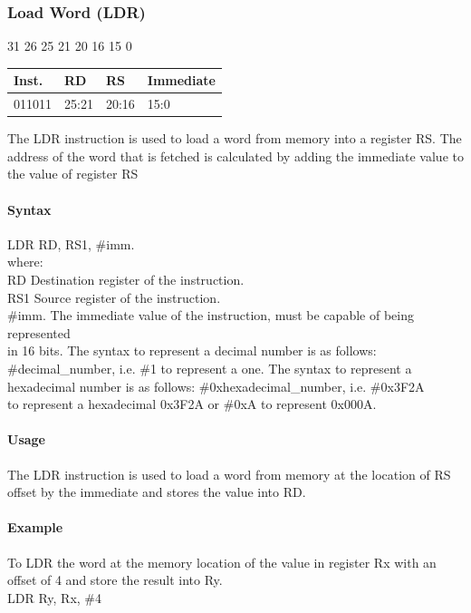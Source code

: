 \documentclass[12pt]{article}
\newcommand{\iTypeInstruction}[6]
{%
    \hspace{1.6cm}31 \hspace{1.15cm}26 \hspace{.05cm}25 \hspace{.8cm}21 \hspace{.05cm}20 \hspace{.8cm}16 \hspace{.05cm}15 \hspace{6.4cm}0
    \vspace{-.25cm}
    \begin{center}
        \begin{tabular}{ |p{1.8cm}|p{1.5cm}|p{1.5cm}|p{6.8cm}| }
            \hline
            \textbf{Inst.} & \textbf{RD} &  \textbf{RS} & \textbf{Immediate}\\
            \hline
            #1 & 25:21 & 20:16 &15:0\\
            \hline
        \end{tabular}
    \end{center}
    
    \noindent
    #2
    
    \paragraph{Syntax}
    \begin{flushleft}
    #3 RD, RS1, \#imm.\\
    \vspace{1em}        %
    where:\\
    \vspace{1em}
    RD  \hspace{3.6em} Destination register of the instruction.\\
    \vspace{1em}
    RS1  \hspace{3.35em} Source register of the instruction.\\
    \vspace{1em}
    \#imm.  \hspace{1.8em} The immediate value of the instruction, must be capable of being represented\\             \hspace{5.4em} in 16 bits. The syntax to represent a decimal number is as follows:\\
            \hspace{5.4em} \#decimal\_number, i.e. \#1 to represent a one. The syntax to represent a\\
            \hspace{5.4em} hexadecimal number is as follows: \#0xhexadecimal\_number, i.e. \#0x3F2A \\
            \hspace{5.4em} to represent a hexadecimal 0x3F2A or \#0xA to represent 0x000A.\\
    \end{flushleft}
    
    \paragraph{Usage}
    \begin{flushleft}
    #4\\
    \end{flushleft}
    \paragraph{Example}
    \begin{flushleft}
    #5\\
    \vspace{1em}
    #6
    \end{flushleft}}
\begin{document}

    \newpage
    \subsubsection{Load Word (LDR)}
    
    \iTypeInstruction
    {011011}
    {The LDR instruction is used to load a word from memory into a register RS. The address of the word that is fetched is calculated by adding the immediate value to the value of register RS}
    {LDR}
    {The LDR instruction is used to load a word from memory at the location of RS offset by the immediate and stores the value into RD.}
    {To LDR the word at the memory location of the value in register Rx with an offset of 4 and store the result into Ry.}
    {LDR Ry, Rx, \#4}
    
    
    
\end{document}
